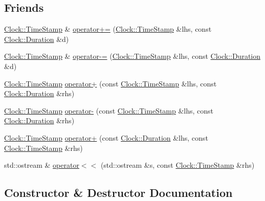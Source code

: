 \subsection*{Friends}
\begin{DoxyCompactItemize}
\item 
\hyperlink{class_clock_1_1_time_stamp}{Clock\+::\+Time\+Stamp} \& \hyperlink{class_clock_1_1_time_stamp_a4ba2a6872ed75f179345c471182c67dc}{operator+=} (\hyperlink{class_clock_1_1_time_stamp}{Clock\+::\+Time\+Stamp} \&lhs, const \hyperlink{class_clock_1_1_duration}{Clock\+::\+Duration} \&d)
\item 
\hyperlink{class_clock_1_1_time_stamp}{Clock\+::\+Time\+Stamp} \& \hyperlink{class_clock_1_1_time_stamp_ae528b7884dfc30e2a28f00c07aa20d24}{operator-\/=} (\hyperlink{class_clock_1_1_time_stamp}{Clock\+::\+Time\+Stamp} \&lhs, const \hyperlink{class_clock_1_1_duration}{Clock\+::\+Duration} \&d)
\item 
\hyperlink{class_clock_1_1_time_stamp}{Clock\+::\+Time\+Stamp} \hyperlink{class_clock_1_1_time_stamp_a0c03a6eab08831e78e238ba6498c40a7}{operator+} (const \hyperlink{class_clock_1_1_time_stamp}{Clock\+::\+Time\+Stamp} \&lhs, const \hyperlink{class_clock_1_1_duration}{Clock\+::\+Duration} \&rhs)
\item 
\hyperlink{class_clock_1_1_time_stamp}{Clock\+::\+Time\+Stamp} \hyperlink{class_clock_1_1_time_stamp_ac693b02ffb2e0b8b9c402642f7f0169f}{operator-\/} (const \hyperlink{class_clock_1_1_time_stamp}{Clock\+::\+Time\+Stamp} \&lhs, const \hyperlink{class_clock_1_1_duration}{Clock\+::\+Duration} \&rhs)
\item 
\hyperlink{class_clock_1_1_time_stamp}{Clock\+::\+Time\+Stamp} \hyperlink{class_clock_1_1_time_stamp_a829ab58b50ec9125fe832b4dfad2cea4}{operator+} (const \hyperlink{class_clock_1_1_duration}{Clock\+::\+Duration} \&lhs, const \hyperlink{class_clock_1_1_time_stamp}{Clock\+::\+Time\+Stamp} \&rhs)
\item 
std\+::ostream \& \hyperlink{class_clock_1_1_time_stamp_a9201b9995d10f34386b474b72ec36407}{operator$<$$<$} (std\+::ostream \&s, const \hyperlink{class_clock_1_1_time_stamp}{Clock\+::\+Time\+Stamp} \&rhs)
\end{DoxyCompactItemize}


\subsection{Constructor \& Destructor Documentation}

